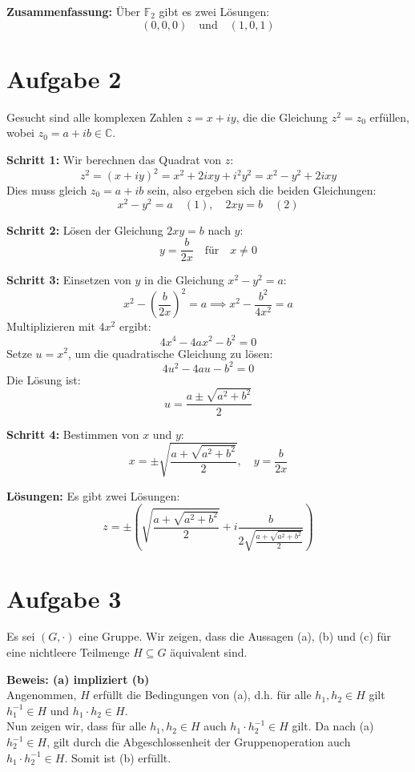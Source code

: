 \documentclass[11pt]{article}
\begin{document}
\textbf{Zusammenfassung:} Über \( \mathbb{F}_2 \) gibt es zwei Lösungen:
\[
(0, 0, 0) \quad \text{und} \quad (1, 0, 1)
\]

\section*{Aufgabe 2}

Gesucht sind alle komplexen Zahlen \( z = x + iy \), die die Gleichung \( z^2 = z_0 \) erfüllen, wobei \( z_0 = a + ib \in \mathbb{C} \).

\textbf{Schritt 1:} Wir berechnen das Quadrat von \( z \):
\[
z^2 = (x + iy)^2 = x^2 + 2ixy + i^2 y^2 = x^2 - y^2 + 2ixy
\]
Dies muss gleich \( z_0 = a + ib \) sein, also ergeben sich die beiden Gleichungen:
\[
x^2 - y^2 = a \quad (1), \quad 2xy = b \quad (2)
\]

\textbf{Schritt 2:} Lösen der Gleichung \( 2xy = b \) nach \( y \):
\[
y = \frac{b}{2x} \quad \text{für} \quad x \neq 0
\]

\textbf{Schritt 3:} Einsetzen von \( y \) in die Gleichung \( x^2 - y^2 = a \):
\[
x^2 - \left( \frac{b}{2x} \right)^2 = a \implies x^2 - \frac{b^2}{4x^2} = a
\]
Multiplizieren mit \( 4x^2 \) ergibt:
\[
4x^4 - 4a x^2 - b^2 = 0
\]
Setze \( u = x^2 \), um die quadratische Gleichung zu lösen:
\[
4u^2 - 4a u - b^2 = 0
\]
Die Lösung ist:
\[
u = \frac{a \pm \sqrt{a^2 + b^2}}{2}
\]

\textbf{Schritt 4:} Bestimmen von \( x \) und \( y \):
\[
x = \pm \sqrt{\frac{a + \sqrt{a^2 + b^2}}{2}}, \quad y = \frac{b}{2x}
\]

\textbf{Lösungen:} Es gibt zwei Lösungen:
\[
z = \pm \left( \sqrt{\frac{a + \sqrt{a^2 + b^2}}{2}} + i \frac{b}{2 \sqrt{\frac{a + \sqrt{a^2 + b^2}}{2}}} \right)
\]

\section*{Aufgabe 3}

Es sei \( (G, \cdot) \) eine Gruppe. Wir zeigen, dass die Aussagen (a), (b) und (c) für eine nichtleere Teilmenge \( H \subseteq G \) äquivalent sind.

\textbf{Beweis: (a) impliziert (b)} \\
Angenommen, \( H \) erfüllt die Bedingungen von (a), d.h. für alle \( h_1, h_2 \in H \) gilt \( h_1^{-1} \in H \) und \( h_1 \cdot h_2 \in H \). \\
Nun zeigen wir, dass für alle \( h_1, h_2 \in H \) auch \( h_1 \cdot h_2^{-1} \in H \) gilt. Da nach (a) \( h_2^{-1} \in H \), gilt durch die Abgeschlossenheit der Gruppenoperation auch \( h_1 \cdot h_2^{-1} \in H \). Somit ist (b) erfüllt.
\end{document}
